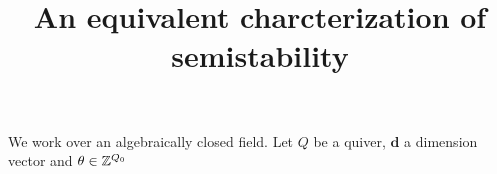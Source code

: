 \documentclass[a4paper]{article}
\title{An equivalent charcterization of semistability}
\author{}
\begin{document}
\maketitle

We work over an algebraically closed field. Let $Q$ be a quiver, $\mathbf{d}$ a dimension vector and $\theta \in \mathbb{Z}^{Q_0}$

\end{document}
